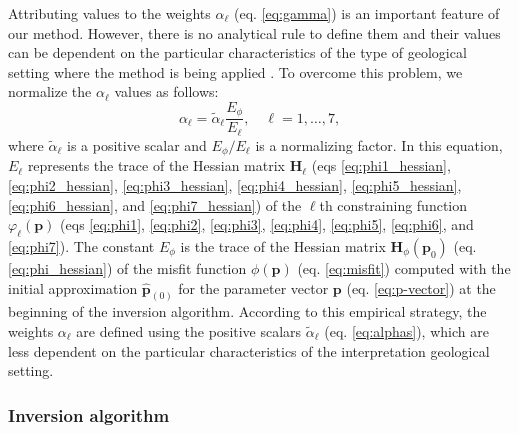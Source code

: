 Attributing values to the weights $ \alpha_{\ell} $ (eq. \ref{eq:gamma}) is an important feature of our method. 
However, there is no analytical rule to define them and their values can be dependent on the particular characteristics of the type of geological setting where the method is being applied \cite{silva-2001}. To overcome this problem, we normalize the $ \alpha_{\ell} $ 
values as follows:
\begin{equation}\label{eq:alphas}
\alpha_{\ell} = \tilde{\alpha}_\ell\frac{E_\phi}{E_\ell}, \quad \ell = 1,\dots, 7,
\end{equation}
where $\tilde{\alpha}_\ell$ is a positive scalar and $ E_\phi/E_\ell $ is a normalizing
factor. In this equation, $ E_\ell $ represents the 
trace of the Hessian matrix $\mathbf{H}_{\ell}$ (eqs \ref{eq:phi1_hessian}, 
\ref{eq:phi2_hessian}, \ref{eq:phi3_hessian}, \ref{eq:phi4_hessian}, \ref{eq:phi5_hessian}, 
\ref{eq:phi6_hessian}, and \ref{eq:phi7_hessian}) of the $\ell$th constraining function 
$\varphi_{\ell}(\mathbf{p})$ (eqs \ref{eq:phi1}, \ref{eq:phi2}, \ref{eq:phi3}, 
\ref{eq:phi4}, \ref{eq:phi5}, \ref{eq:phi6}, and \ref{eq:phi7}). 
The constant $E_\phi$ is the trace of the Hessian matrix 
$\mathbf{H}_{\phi}(\mathbf{p}_{0})$ (eq. \ref{eq:phi_hessian}) of the misfit function 
$\phi(\mathbf{p})$ (eq. \ref{eq:misfit}) computed with the initial approximation $\hat{\mathbf{p}}_{(0)}$ 
for the parameter vector $ \mathbf{p} $ (eq. \ref{eq:p-vector}) at the beginning of the inversion algorithm. According to this empirical strategy, the weights $ \alpha_{\ell} $ are defined using the positive scalars $\tilde{\alpha}_\ell$ (eq. \ref{eq:alphas}), which are less dependent on the particular characteristics of the interpretation geological setting.

\subsubsection{Inversion algorithm}

